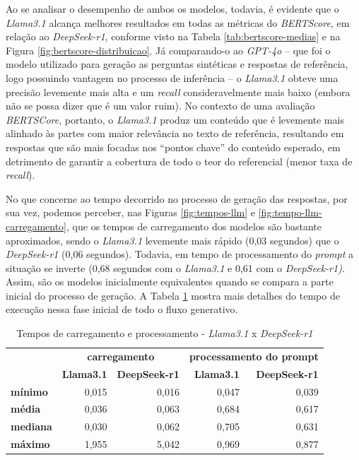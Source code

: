 Ao se analisar o desempenho de ambos os modelos, todavia, é evidente que o \textit{Llama3.1} alcança melhores resultados em todas as métricas do \textit{BERTScore}, em relação ao \textit{DeepSeek-r1}, conforme visto na Tabela \ref{tab:bertscore-medias} e na Figura \ref{fig:bertscore-distribuicao}. Já comparando-o ao \textit{GPT-4o} -- que foi o modelo utilizado para geração as perguntas sintéticas e respostas de referência, logo possuindo vantagem no processo de inferência -- o \textit{Llama3.1} obteve uma precisão levemente mais alta e um \textit{recall} consideravelmente mais baixo (embora não se possa dizer que é um valor ruim). No contexto de uma avaliação \textit{BERTSCore}, portanto, o \textit{Llama3.1} produz um conteúdo que é levemente mais alinhado às partes com maior relevância no texto de referência, resultando em respostas que são mais focadas nos ``pontos chave'' do conteúdo esperado, em detrimento de garantir a cobertura de todo o teor do referencial (menor taxa de \textit{recall}). 

No que concerne ao tempo decorrido no processo de geração das respostas, por sua vez, podemos perceber, nas Figuras \ref{fig:tempos-llm} e \ref{fig:tempo-llm-carregamento}, que os tempos de carregamento dos modelos são bastante aproximados, sendo o \textit{Llama3.1} levemente mais rápido (0,03 segundos) que o \textit{DeepSeek-r1} (0,06 segundos). Todavia, em tempo de processamento do \textit{prompt} a situação se inverte (0,68 segundos com o \textit{Llama3.1} e 0,61 com o \textit{DeepSeek-r1)}. Assim, são os modelos inicialmente equivalentes quando se compara a parte inicial do processo de geração. A Tabela \ref{tab:tempo-llms-carregamento} mostra mais detalhes do tempo de execução nessa fase inicial de todo o fluxo generativo.

\begin{table}[H]
    \centering
    \begin{tabular}{l rr | rr}
        \hline
        & \multicolumn{2}{c|}{\textbf{carregamento}} & \multicolumn{2}{c}{\textbf{processamento do prompt}} \\
        & \textbf{Llama3.1} & \textbf{DeepSeek-r1} & \textbf{Llama3.1} & \textbf{DeepSeek-r1} \\
        \hline
        \textbf{mínimo} & 0,015 & 0,016 & 0,047 & 0,039 \\
        \textbf{média} & 0,036 & 0,063 & 0,684 & 0,617 \\
        \textbf{mediana} & 0,030 & 0,062 & 0,705 & 0,631 \\
        \textbf{máximo} & 1,955 & 5,042 & 0,969 & 0,877 \\
        \hline
    \end{tabular}
    \caption{Tempos de carregamento e processamento - \textit{Llama3.1} x \textit{DeepSeek-r1}}
    \label{tab:tempo-llms-carregamento}
\end{table}

